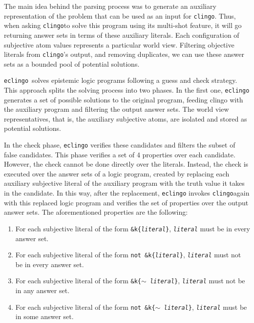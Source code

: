 \documentclass{new_tlp}
\def\eclingo{{\tt eclingo}}
\def\clingo{{\tt clingo}}
\begin{document}
The main idea behind the parsing process was to generate an auxiliary representation of the problem that can be used as an input for \clingo. Thus, when asking \clingo to solve this program using its multi-shot feature, it will go returning answer sets in terms of these auxiliary literals. Each configuration of subjective atom values represents a particular world view. Filtering objective literals from \clingo's output, and removing duplicates, we can use these answer sets as a bounded pool of potential solutions.

\eclingo\ solves epistemic logic programs following a guess and check strategy. This approach splits the solving process into two phases. In the first one, \eclingo{} generates a set of possible solutions to the original program, feeding clingo with the auxiliary program and filtering the output answer sets. The world view representatives, that is, the auxiliary subjective atoms, are isolated and stored as potential solutions.

In the check phase, \eclingo{} verifies these candidates and filters the subset of false candidates.
This phase verifies a set of 4 properties over each candidate. However, the check cannot be done directly over the literals. Instead, the check is executed over the answer sets of a logic program, created by replacing each auxiliary subjective literal of the auxiliary program with the truth value it takes in the candidate. In this way, after the replacement, \eclingo{} invokes \clingo again with this replaced logic program and verifies the set of properties over the output answer sets. The aforementioned properties are the following:
\begin{enumerate}
    \item For each subjective literal of the form \texttt{\&k\{\emph{literal}\}}, \texttt{\emph{literal}} must be in every answer set.

    \item For each subjective literal of the form \texttt{not \&k\{\emph{literal}\}}, \texttt{\emph{literal}} must not be in every answer set.

    \item For each subjective literal of the form \texttt{\&k\{$\sim$ \emph{literal}\}}, \texttt{\emph{literal}} must not be in any answer set.

    \item For each subjective literal of the form \texttt{not \&k\{$\sim$ \emph{literal}\}}, \texttt{\emph{literal}} must be in some answer set.
\end{enumerate}
\end{document}
